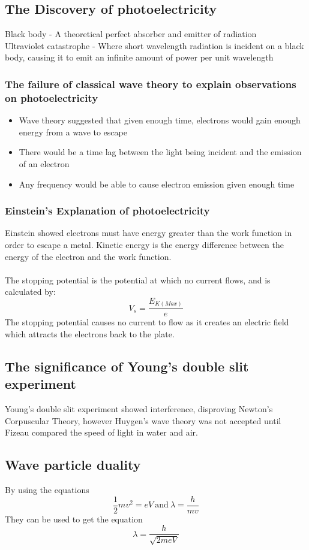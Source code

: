 \documentclass[12pt]{article}
\begin{document}
\subsection{The Discovery of photoelectricity}
Black body - A theoretical perfect absorber and emitter of radiation\\
Ultraviolet catastrophe - Where short wavelength radiation is incident on a black body, causing it to emit an infinite amount of power per unit wavelength
\subsubsection{The failure of classical wave theory to explain observations on photoelectricity}
\begin{itemize}
\item Wave theory suggested that given enough time, electrons would gain enough energy from a wave to escape
\item There would be a time lag between the light being incident and the emission of an electron
\item Any frequency would be able to cause electron emission given enough time
\end{itemize}
\subsubsection{Einstein's Explanation of photoelectricity}
Einstein showed electrons must have energy greater than the work function in order to escape a metal. Kinetic energy is the energy difference between the energy of the electron and the work function.\\
\\
The stopping potential is the potential at which no current flows, and is calculated by:
$$V_s=\frac{E_{K(Max)}}{e}$$
The stopping potential causes no current to flow as it creates an electric field which attracts the electrons back to the plate.
\subsection{The significance of Young's double slit experiment}
Young's double slit experiment showed interference, disproving Newton's Corpuscular Theory, however Huygen's wave theory was not accepted until Fizeau compared the speed of light in water and air.
\subsection{Wave particle duality}
By using the equations
$$\frac{1}{2}mv^2=eV \ \textrm{and} \ \lambda=\frac{h}{mv}$$
They can be used to get the equation
$$\lambda=\frac{h}{\sqrt{2meV}}$$
\end{document}
